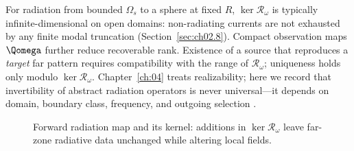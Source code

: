 For radiation from bounded $\Omega_s$ to a sphere at fixed $R$, $\ker\mathcal{R}_\omega$ is typically infinite-dimensional on open domains: non-radiating currents are not exhausted by any finite modal truncation (Section~\ref{sec:ch02.8}). Compact observation maps $\Qomega$ further reduce recoverable rank. Existence of a source that reproduces a \emph{target} far pattern requires compatibility with the range of $\mathcal{R}_\omega$; uniqueness holds only modulo $\ker\mathcal{R}_\omega$. Chapter~\ref{ch:04} treats realizability; here we record that invertibility of abstract radiation operators is never universal---it depends on domain, boundary class, frequency, and outgoing selection \cite{colton1992,devaney2004}.

\begin{figure}[t]
\centering
{}
\caption{Forward radiation map and its kernel: additions in $\ker\mathcal{R}_\omega$ leave far-zone radiative data unchanged while altering local fields.}
\label{fig:ch2.fredholm-radiation-map}
\end{figure}
